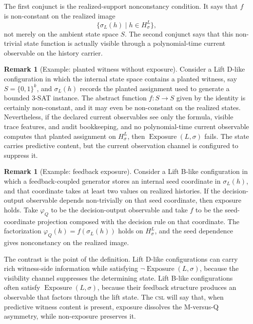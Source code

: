 \documentclass[11pt]{article}
\newcommand{\CSL}{\textsc{csl}}            \newcommand{\CSLcore}{Candidate Structural Law}
\newcommand{\Substrate}{\sigma}             \newcommand{\Lift}{L}                       \newcommand{\LiftState}{\sigma_{L}}         \newcommand{\HistorySpace}{H_{\Substrate}^{\Lift}}
\newcommand{\CurrentObservable}{\varphi_{Q}}    \newcommand{\Exposure}{\operatorname{Exposure}}
\theoremstyle{definition}
\newtheorem{remark}[theorem]{Remark}
\begin{document}
The first conjunct is the realized-support nonconstancy condition.  It
says that \(f\) is non-constant on the realized image
\[
  \{\LiftState(h)\mid h\in\HistorySpace\},
\]
not merely on the ambient state space \(S\).  The second conjunct says
that this non-trivial state function is actually visible through a
polynomial-time current observable on the history carrier.

\begin{remark}[Example: planted witness without exposure]
Consider a Lift D-like configuration in which the internal state space
contains a planted witness, say \(S=\{0,1\}^{k}\), and
\(\LiftState(h)\) records the planted assignment used to generate a
bounded 3-SAT instance.  The abstract function \(f:S\to S\) given by
the identity is certainly non-constant, and it may even be
non-constant on the realized states.  Nevertheless, if the declared
current observables see only the formula, visible trace features, and
audit bookkeeping, and no polynomial-time current observable computes
that planted assignment on \(\HistorySpace\), then
\(\Exposure(\Lift,\Substrate)\) fails.  The state carries predictive
content, but the current observation channel is configured to suppress
it.
\end{remark}

\begin{remark}[Example: feedback exposure]
Consider a Lift B-like configuration in which a feedback-coupled
generator stores an internal seed coordinate in \(\LiftState(h)\), and
that coordinate takes at least two values on realized histories.  If
the decision-output observable depends non-trivially on that seed
coordinate, then exposure holds.  Take \(\CurrentObservable\) to be
the decision-output observable and take \(f\) to be the seed-coordinate
projection composed with the decision rule on that coordinate.  The
factorization \(\CurrentObservable(h)=f(\LiftState(h))\) holds on
\(\HistorySpace\), and the seed dependence gives nonconstancy on the
realized image.
\end{remark}

The contrast is the point of the definition.  Lift D-like
configurations can carry rich witness-side information while satisfying
\(\neg\Exposure(\Lift,\Substrate)\), because the visibility channel
suppresses the determining state.  Lift B-like configurations often
satisfy \(\Exposure(\Lift,\Substrate)\), because their feedback
structure produces an observable that factors through the lift state.
The \CSL{} will say that, when predictive witness content is present,
exposure dissolves the M-versus-Q asymmetry, while non-exposure
preserves it.
\end{document}
